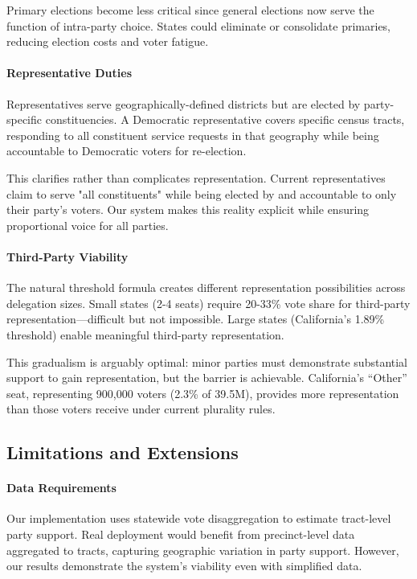 Primary elections become less critical since general elections now serve the function of intra-party choice. States could eliminate or consolidate primaries, reducing election costs and voter fatigue.

\paragraph{Representative Duties}
Representatives serve geographically-defined districts but are elected by party-specific constituencies. A Democratic representative covers specific census tracts, responding to all constituent service requests in that geography while being accountable to Democratic voters for re-election.

This clarifies rather than complicates representation. Current representatives claim to serve "all constituents" while being elected by and accountable to only their party's voters. Our system makes this reality explicit while ensuring proportional voice for all parties.

\paragraph{Third-Party Viability}
The natural threshold formula creates different representation possibilities across delegation sizes. Small states (2-4 seats) require 20-33\% vote share for third-party representation---difficult but not impossible. Large states (California's 1.89\% threshold) enable meaningful third-party representation.

This gradualism is arguably optimal: minor parties must demonstrate substantial support to gain representation, but the barrier is achievable. California's ``Other'' seat, representing 900,000 voters (2.3\% of 39.5M), provides more representation than those voters receive under current plurality rules.

\subsection{Limitations and Extensions}

\paragraph{Data Requirements}
Our implementation uses statewide vote disaggregation to estimate tract-level party support. Real deployment would benefit from precinct-level data aggregated to tracts, capturing geographic variation in party support. However, our results demonstrate the system's viability even with simplified data.

